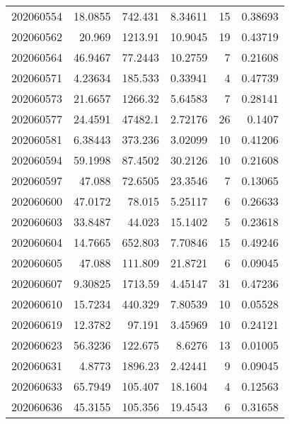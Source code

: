 \begin{tabular}{rrrrrr}
 202060554 &         18.0855  &      742.431  &            8.34611 &          15 & 0.38693 \\
 202060562 &         20.969   &     1213.91   &           10.9045  &          19 & 0.43719 \\
 202060564 &         46.9467  &       77.2443 &           10.2759  &           7 & 0.21608 \\
 202060571 &          4.23634 &      185.533  &            0.33941 &           4 & 0.47739 \\
 202060573 &         21.6657  &     1266.32   &            5.64583 &           7 & 0.28141 \\
 202060577 &         24.4591  &    47482.1    &            2.72176 &          26 & 0.1407  \\
 202060581 &          6.38443 &      373.236  &            3.02099 &          10 & 0.41206 \\
 202060594 &         59.1998  &       87.4502 &           30.2126  &          10 & 0.21608 \\
 202060597 &         47.088   &       72.6505 &           23.3546  &           7 & 0.13065 \\
 202060600 &         47.0172  &       78.015  &            5.25117 &           6 & 0.26633 \\
 202060603 &         33.8487  &       44.023  &           15.1402  &           5 & 0.23618 \\
 202060604 &         14.7665  &      652.803  &            7.70846 &          15 & 0.49246 \\
 202060605 &         47.088   &      111.809  &           21.8721  &           6 & 0.09045 \\
 202060607 &          9.30825 &     1713.59   &            4.45147 &          31 & 0.47236 \\
 202060610 &         15.7234  &      440.329  &            7.80539 &          10 & 0.05528 \\
 202060619 &         12.3782  &       97.191  &            3.45969 &          10 & 0.24121 \\
 202060623 &         56.3236  &      122.675  &            8.6276  &          13 & 0.01005 \\
 202060631 &          4.8773  &     1896.23   &            2.42441 &           9 & 0.09045 \\
 202060633 &         65.7949  &      105.407  &           18.1604  &           4 & 0.12563 \\
 202060636 &         45.3155  &      105.356  &           19.4543  &           6 & 0.31658 \\

\end{tabular}
